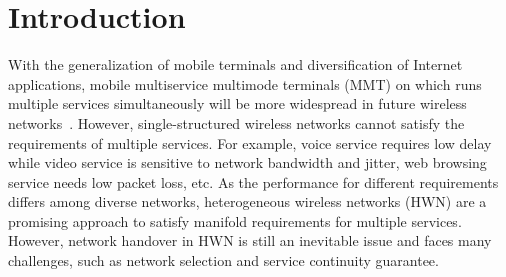 \documentclass[conference]{IEEEtran}
\begin{document}
\section{Introduction}

\begin{comment}
	Introduction按照这个思路写
	第一段：交代背景，引出问题（网络选择和网络切换？）
	然后把两个问题分两段进行literature review，一段说SDN，一段说选择切换，分析现有算法/应用是啥啥啥，然后不足是啥，再引出你要用的方法
	然后单独拿出一段说你的贡献，比方说是提出了结合FAHP和MPTCP的结构，分析了这个方法的***，仿真结果表明***
	最后是the rest of papercontent...
\end{comment}
With the generalization of mobile terminals and diversification of Internet applications,
mobile multiservice multimode terminals (MMT) on which runs multiple services simultaneously will be more widespread in future wireless networks~\cite{MECsurvey,Cacheinsky}.  
However, single-structured wireless networks cannot satisfy the requirements of multiple services.
For example, voice service requires low delay while video service is sensitive to network bandwidth and jitter, web browsing service needs low packet loss, etc.
As the performance for different requirements differs among diverse networks,
heterogeneous wireless networks (HWN) are a promising approach to satisfy manifold requirements for multiple services\cite{het}. 
However, network handover in HWN is still an inevitable issue and faces many challenges, such as network selection and service continuity guarantee.




\end{document}
